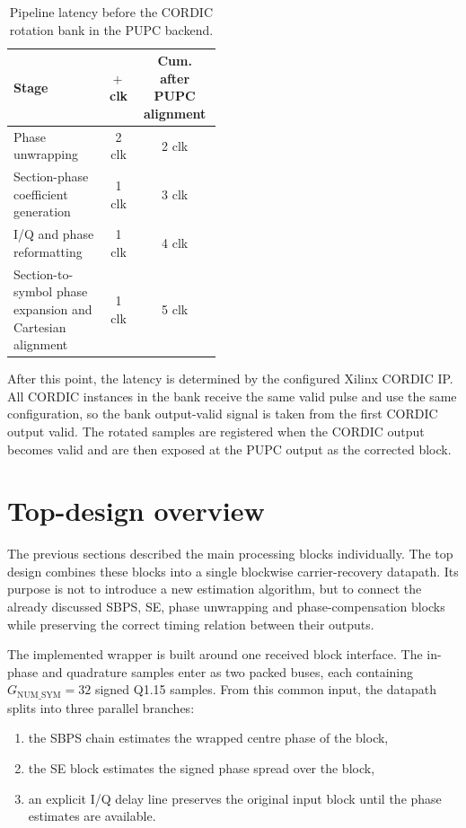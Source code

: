 \begin{table}[H]
    \centering
    \caption{Pipeline latency before the CORDIC rotation bank in the PUPC backend.}
    \label{tab:pupc-precordic-latency}
    \small
    \begin{tabular}{p{0.46\linewidth} c c}
        \hline
        Stage & $+\,$clk & Cum. after PUPC alignment \\
        \hline
        Phase unwrapping & 2 clk & 2 clk \\
        Section-phase coefficient generation & 1 clk & 3 clk \\
        I/Q and phase reformatting & 1 clk & 4 clk \\
        Section-to-symbol phase expansion and Cartesian alignment & 1 clk & 5 clk \\
        \hline
    \end{tabular}
\end{table}

After this point, the latency is determined by the configured Xilinx CORDIC IP. All CORDIC instances in the bank receive the same valid pulse and use the same configuration, so the bank output-valid signal is taken from the first CORDIC output valid. The rotated samples are registered when the CORDIC output becomes valid and are then exposed at the PUPC output as the corrected block.

\section{Top-design overview}

The previous sections described the main processing blocks individually. The top design combines these blocks into a single blockwise carrier-recovery datapath. Its purpose is not to introduce a new estimation algorithm, but to connect the already discussed \ac{SBPS}, \ac{SE}, phase unwrapping and phase-compensation blocks while preserving the correct timing relation between their outputs.

The implemented wrapper is built around one received block interface. The in-phase and quadrature samples enter as two packed buses, each containing \(G_{\mathrm{NUM\_SYM}}=32\) signed Q1.15 samples. From this common input, the datapath splits into three parallel branches:

\begin{enumerate}
    \item the \ac{SBPS} chain estimates the wrapped centre phase of the block,
    \item the \ac{SE} block estimates the signed phase spread over the block,
    \item an explicit I/Q delay line preserves the original input block until the phase estimates are available.
\end{enumerate}

